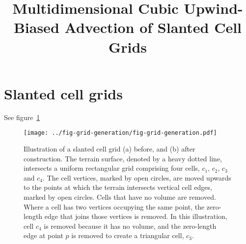 \documentclass{article}
\title{Multidimensional Cubic Upwind-Biased Advection of Slanted Cell Grids}
\begin{document}
\maketitle

\section{Slanted cell grids}
See figure~\ref{fig:grid-generation}
\begin{figure}
	\centering
	\texttt{[image: ../fig-grid-generation/fig-grid-generation.pdf]}
	\caption{Illustration of a slanted cell grid (a) before, and (b) after construction.
	The terrain surface, denoted by a heavy dotted line, intersects a uniform rectangular grid comprising four cells, $c_1$, $c_2$, $c_3$ and $c_4$.  The cell vertices, marked by open circles, are moved upwards to the points at which the terrain intersects vertical cell edges, marked by open circles.  Cells that have no volume are removed.  Where a cell has two vertices occupying the same point, the zero-length edge that joins those vertices is removed.  In this illustration, cell $c_4$ is removed because it has no volume, and the zero-length edge at point $p$ is removed to create a triangular cell, $c_3$.}
	\label{fig:grid-generation}
\end{figure}
\clearpage
\end{document}
